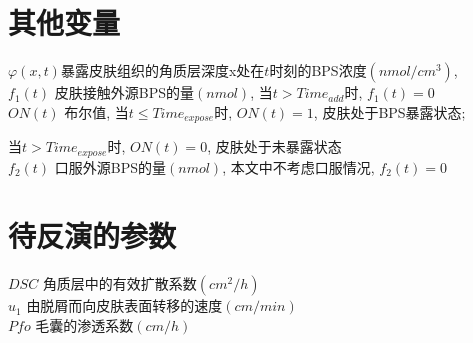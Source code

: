 \documentclass[a4paper,punct=banjiao,twoside]{ctexrep}
\theoremstyle{plain}
\theoremstyle{definition}
\theoremstyle{remark}
\begin{document}
\section*{其他变量}
\noindent$\varphi(x,t)${\hfill   暴露皮肤组织的角质层深度x处在$t$时刻的BPS浓度$(nmol/cm^3)$,}\\
$f_1(t)$ {\hfill  皮肤接触外源BPS的量$(nmol)$, 当$t> Time_{add}$时, $f_1(t)=0$}\\
$ON(t)$ {\hfill  布尔值, 当$t\leq Time_{expose}$时, $ON(t)=1$, 皮肤处于BPS暴露状态;}

\hfill 当$t> Time_{expose}$时, $ON(t)=0$, 皮肤处于未暴露状态\\
$f_2(t)$ {\hfill  口服外源BPS的量$(nmol)$, 本文中不考虑口服情况, $f_2(t)=0$}\\

\section*{待反演的参数}
\noindent$DSC$ {\hfill  角质层中的有效扩散系数$(cm^2/h)$}\\
$u_1$ {\hfill  由脱屑而向皮肤表面转移的速度$(cm/min)$}\\
$Pfo$ {\hfill  毛囊的渗透系数$(cm/h)$}
\end{document}
